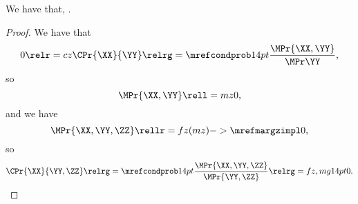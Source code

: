 \begin{proposition}
  We have that, \pzerocindprop.%
\end{proposition}

\begin{proof}
  We have that 
  $$0 \relr = cz \CPr{\XX}{\YY} \relrg = {\mrefcondprob} 14pt \frac{\MPr{\XX, \YY}}{\MPr\YY},$$
  so 
  $$\MPr{\XX, \YY} \rell = mz 0,$$
  and we have
  $$\MPr{\XX, \YY, \ZZ} \rellr = fz (mz)->{\mrefmargzimpl} 0,$$
  so
  $$\CPr{\XX}{\YY, \ZZ} \relrg = {\mrefcondprob} 14pt \frac{\MPr{\XX, \YY, \ZZ}}{\MPr{\YY,\ZZ}} \relrg = fz,mg 14pt 0.$$
\end{proof}
